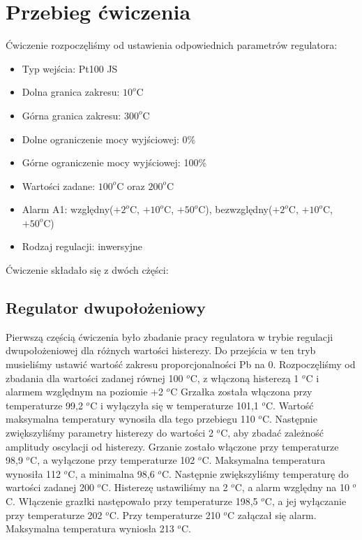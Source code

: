\documentclass[a4paper, 12pt]{article}
\begin{document}
	\section{Przebieg ćwiczenia}
		Ćwiczenie rozpoczęliśmy od ustawienia odpowiednich parametrów regulatora: 
		\begin{itemize}
			\item Typ wejścia: Pt100 JS
			\item Dolna granica zakresu: $10^o\mathrm{C}$
			\item Górna granica zakresu: $300^o\mathrm{C}$
			\item Dolne ograniczenie mocy wyjściowej: 0\%
			\item Górne ograniczenie mocy wyjściowej: 100\%
			\item Wartości zadane: $100^o\mathrm{C}$ oraz $200^o\mathrm{C}$
			\item Alarm A1: względny($+2^o\mathrm{C}$, $+10^o\mathrm{C}$, $+50^o\mathrm{C}$), bezwzględny($+2^o\mathrm{C}$, $+10^o\mathrm{C}$, $+50^o\mathrm{C}$)
			\item Rodzaj regulacji: inwersyjne
		\end{itemize}
		Ćwiczenie składało się z dwóch cżęści:
		\subsection{Regulator dwupołożeniowy}
			Pierwszą częścią ćwiczenia było zbadanie pracy regulatora w trybie regulacji dwupołożeniowej dla różnych wartości histerezy. Do przejścia w ten tryb musieliśmy ustawić wartość zakresu proporcjonalności Pb na 0. 
			\newline
			\newline
			Rozpoczęliśmy od zbadania dla wartości zadanej równej 100 $^o$C, z włączoną histerezą 1 $^o$C i alarmem względnym na poziomie +2 $^o$C Grzałka została włączona przy temperaturze 99,2 $^o$C i wyłączyła się w temperaturze 101,1 $^o$C. Wartość maksymalna temperatury wynosiła dla tego przebiegu 110 $^o$C. 
			\newline
			\newline 
			Następnie zwiększyliśmy parametry histerezy do wartości 2 $^o$C, aby zbadać zależność amplitudy oscylacji od histerezy. Grzanie zostało włączone przy temperaturze 98,9 $^o$C, a wyłączone przy temperaturze 102 $^o$C. Maksymalna temperatura wynosiła 112 $^o$C, a minimalna 98,6 $^o$C.
			\newline 
			\newline
			Następnie zwiększyliśmy temperaturę do wartości zadanej 200 $^o$C. Histerezę ustawiliśmy na 2 $^o$C, a alarm względny na 10 $^o$C.  Włączenie grazłki następowało przy temperaturze 198,5 $^o$C, a jej wyłączanie przy temperaturze 202 $^o$C. Przy temperaturze 210 $^o$C załączał się alarm. Maksymalna temperatura wyniosła 213 $^o$C.
\end{document}
